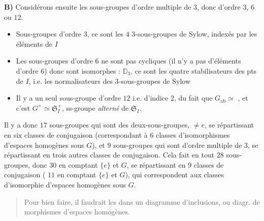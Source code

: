 \documentclass[11pt,a4paper]{article}
\begin{document}
\textbf{B)} Considérons ensuite les sous-groupes  d'ordre multiple de $3$, donc d'ordre $3$, $6$ ou $12$.

\begin{itemize}
  \item[g)] Sous-groupes d'ordre $3$, ce sont les $4$ $3$-sous-groupes de Sylow, indexés par les éléments de $I$
  \item[h)] Les sous-groupes d'ordre $6$ ne sont pas cycliques (il n'y a pas d'éléments d'ordre $6$) donc sont isomorphes : $\mathbb{D}_3$,  ce sont les quatre stabilisateurs des pts de $I$, i.e. les normalisateurs des $3$-sous-groupes de Sylow
  \item[i)] Il y a un seul sous-groupe d'ordre $12$ i.e. d'indice $2$, du fait que  $G_{\mathrm{ab}} \simeq$ , et c'est $G^+ \simeq \mathfrak{S}_I^+$, ss-groupe \emph{alterné} de $\mathfrak{S}_I$.
\end{itemize}

Il y a donc  $17$ sous-groupes qui sont des deux-sous-groupes, $\neq e$, se répartissant en six classes de conjugaison (correspondant  à $6$ classes d'isomorphismes d'espaces homogènes sous $G$), et $9$ sous-groupes  qui sont d'ordre multiple de $3$, se répartissant en trois autres classes de conjugaison. Cela fait en tout $28$ sous-groupes, donc $30$ en comptant $\{e\}$ et $G$, se répartissant en $9$ classes de conjugaison ( $11$ en comptant $\{e\}$ et $G$), qui correspondent aux classes d'isomorphie d'espaces homogènes sous $G$.

\begin{quote}
Pour bien faire, il faudrait les  \ill{} dans un diagramme d'inclusions, ou diagr. de morphismes d'espaces homogènes.
\end{quote}
\end{document}
